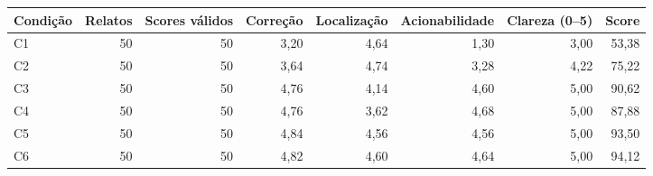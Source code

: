 \begin{tabular}{|l|r|r|r|r|r|r|r|}
\hline
\textbf{Condição} & \textbf{Relatos} & \textbf{Scores válidos} & \textbf{Correção} & \textbf{Localização} & \textbf{Acionabilidade} & \textbf{Clareza (0--5)} & \textbf{Score} \\
\hline
C1 & 50 & 50 & 3,20 & 4,64 & 1,30 & 3,00 & 53,38 \\
\hline
C2 & 50 & 50 & 3,64 & 4,74 & 3,28 & 4,22 & 75,22 \\
\hline
C3 & 50 & 50 & 4,76 & 4,14 & 4,60 & 5,00 & 90,62 \\
\hline
C4 & 50 & 50 & 4,76 & 3,62 & 4,68 & 5,00 & 87,88 \\
\hline
C5 & 50 & 50 & 4,84 & 4,56 & 4,56 & 5,00 & 93,50 \\
\hline
C6 & 50 & 50 & 4,82 & 4,60 & 4,64 & 5,00 & 94,12 \\
\hline
\end{tabular}
